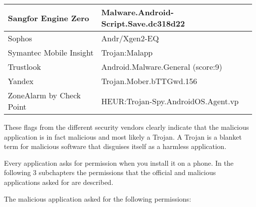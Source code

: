 \begin{tabular}{|l|l|}
    Sangfor Engine Zero      & Malware.Android-Script.Save.dc318d22 \\ \hline
    Sophos                   & Andr/Xgen2-EQ                        \\ \hline
    Symantec Mobile Insight  & Trojan:Malapp                        \\ \hline
    Trustlook                & Android.Malware.General (score:9)    \\ \hline
    Yandex                   & Trojan.Mober.bTTGwd.156              \\ \hline
    ZoneAlarm by Check Point & HEUR:Trojan-Spy.AndroidOS.Agent.vp   \\ \hline
\end{tabular}

These flags from the different security vendors clearly indicate that the malicious application is in fact malicious and most likely a Trojan.
A Trojan is a blanket term for malicious software that disguises itself as a harmless application.

\newpage
{}
Every application asks for permission when you install it on a phone.
In the following 3 subchapters the permissions that the official and malicious applications asked for are described.

The malicious application asked for the following permissions:


